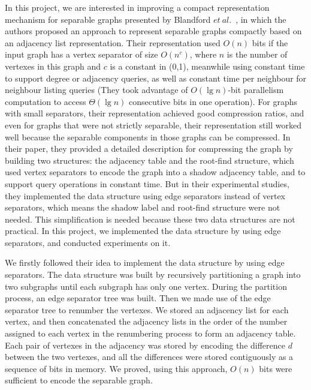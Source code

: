 \documentclass[12pt,glossary]{dalthesis}
\begin{document}
\bigskip


In this project, we are interested in improving a compact representation mechanism for separable graphs presented by Blandford $et \ al.$~\cite{compact-representation}, in which the authors proposed an approach to represent separable graphs compactly based on an adjacency list representation. Their representation used $O(n)$ bits if the input graph has a vertex separator of size $O(n^{c})$, where $n$ is the number of vertexes in this graph and $c$ is a constant in (0,1), meanwhile using constant time to support degree or adjacency queries, as well as constant time per neighbour for neighbour listing queries (They took advantage of $O(\lg n)$-bit parallelism computation to access $\Theta(\lg n)$ consecutive bits in one operation). For graphs with small separators, their representation achieved good compression ratios, and even for graphs that were not strictly separable, their representation still worked well because the separable components in those graphs can be compressed. In their paper, they provided a detailed description for compressing the graph by building two structures: the adjacency table and the root-find structure, which used vertex separators to encode the graph into a shadow adjacency table, and to support query operations in constant time. But in their experimental studies, they implemented the data structure using edge separators instead of vertex separators, which means the shadow label and root-find structure were not needed. This simplification is needed because these two data structures are not practical. In this project, we implemented the data structure by using edge separators, and conducted experiments on it.

\bigskip
\bigskip

We firstly followed their idea to implement the data structure by using edge separators. The data structure was built by recursively partitioning a graph into two subgraphs until each subgraph has only one vertex. During the partition process, an edge separator tree was built. Then we made use of the edge separator tree to renumber the vertexes. We stored an adjacency list for each vertex, and then concatenated the adjacency lists in the order of the number assigned to each vertex in the renumbering process to form an adjacency table. Each pair of vertexes in the adjacency was stored by encoding the difference $d$ between the two vertexes, and all the differences were stored contiguously as a sequence of bits in memory. We proved, using this approach, $O(n)$ bits were sufficient to encode the separable graph. 
\end{document}
